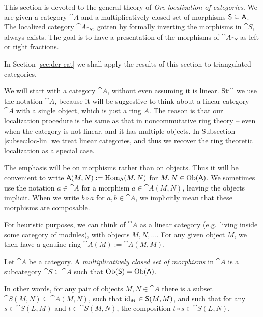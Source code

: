 \cleardoublepage
{} \label{sec:loc-cats}

\AYcopyright

This section is devoted to the general theory of {\em Ore 
localization of categories}. We are given a category $\cat{A}$ and a 
multiplicatively closed set of morphisms $\operatorname{\mathsf{S}} \subseteq \operatorname{\mathsf{A}}$.
The localized category $\cat{A}_{\cat{S}}$, gotten by formally inverting the 
morphisms in $\cat{S}$, always exists. The goal is to have a presentation of the
morphisms of $\cat{A}_{\cat{S}}$ as left or right fractions. 

In Section \ref{sec:der-cat} we shall apply the results of this section to 
triangulated categories. 


We will start with a category $\cat{A}$, without even assuming it is 
linear. Still we use the notation $\cat{A}$, because it will be suggestive to 
think about a linear category $\cat{A}$ with a single object, which is just a 
ring $A$. The reason is that our localization procedure is the same as that in 
noncommutative ring theory -- even when the category is not linear, and it has 
multiple objects. In Subsection \ref{subsec:loc-lin} we treat linear 
categories, and thus we recover the ring theoretic localization as a special 
case. 

The emphasis will be on morphisms rather than on objects. Thus it will be 
convenient to write 
$\operatorname{\mathsf{A}}(M, N) := \operatorname{Hom}_{\operatorname{\mathsf{A}}}(M, N)$
for $M, N \in \operatorname{Ob}(\operatorname{\mathsf{A}})$. 
We sometimes use the notation $a \in \cat{A}$ for a morphism 
$a \in \cat{A}(M, N)$, leaving the objects implicit. When we write $b \circ a$ 
for $a, b \in \cat{A}$, we implicitly mean that these morphisms are 
composable. 

For heuristic purposes, we can think of $\cat{A}$ as a linear category (e.g.\ 
living inside some category of modules), with objects $M, N, \ldots$.
For any given object $M$, we then have a genuine ring 
$\cat{A}(M) := \cat{A}(M, M)$. 

\begin{dfn} \label{dfn:1405}
Let $\cat{A}$ be a category. A 
{\em multiplicatively closed set of morphisms}%
in $\cat{A}$ is a subcategory $\cat{S} \subseteq \cat{A}$ such that 
$\operatorname{Ob}(\operatorname{\mathsf{S}}) = \operatorname{Ob}(\operatorname{\mathsf{A}})$.
\end{dfn}

In other words, for any pair of objects $M, N \in \cat{A}$ 
there is a subset $\cat{S}(M, N) \subseteq \cat{A}(M, N)$, 
such that $\operatorname{id}_M \in \operatorname{\mathsf{S}}(M, M)$, and such that for any
$s \in \cat{S}(L, M)$ and $t \in \cat{S}(M, N)$, the composition
$t \circ s \in \cat{S}(L, N)$. 

